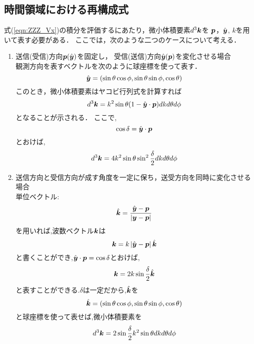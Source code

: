 \subsection{時間領域における再構成式}
式(\ref{eqn:ZZZ_Vx})の積分を評価するにあたり，微小体積要素$d^3\mbox{\boldmath $k$}$を 
$\mbox{\boldmath $p$}$，$\hat{\mbox{\boldmath $y$}}$, $k$を用いて表す必要がある．
ここでは，次のような二つのケースについて考える．
\begin{enumerate}
\item
	送信(受信)方向$\mbox{\boldmath $p$}(\hat{\mbox{\boldmath $y$}})$を固定し，
	受信(送信)方向$\hat{\mbox{\boldmath $y$}}(\mbox{\boldmath $p$})$を変化させる場合\\

	観測方向を表すベクトルを次のように球座標を使って表す．
	\begin{equation}
		\hat{\mbox{\boldmath $y$}}=(\sin\theta\cos\phi,\sin\theta\sin\phi, \cos\theta)
		\label{eqn:ZZZ_22}
	\end{equation}
	このとき，微小体積要素はヤコビ行列式を計算すれば
	\begin{equation}
		d^3\mbox{\boldmath $k$}=k^2\sin\theta (1-\hat{\mbox{\boldmath $y$}}\cdot\mbox{\boldmath $p$})dkd\theta d\phi
		\label{eqn:ZZZ_23}
	\end{equation}
	となることが示される．
	ここで,
	\begin{equation}
		\cos\delta=\hat{\mbox{\boldmath $y$}}\cdot\mbox{\boldmath $p$}
		\label{eqn:ZZZ_24}
	\end{equation}
	とおけば,
	\begin{equation}
		d^3\mbox{\boldmath $k$}=4k^2\sin\theta \sin^2 \frac{\delta}{2} dkd\theta d\phi
		\label{eqn:ZZZ_25}
	\end{equation}
\item
	送信方向と受信方向が成す角度を一定に保ち，送受方向を同時に変化させる場合\\

	単位ベクトル:
	\begin{equation}
		\hat{\mbox{\boldmath $k$}}=\frac{\hat{\mbox{\boldmath $y$}}-\mbox{\boldmath $p$}}
		{\left| \mbox{\boldmath $y$}-\mbox{\boldmath $p$} \right| }
		\label{eqn:ZZZ_26}
	\end{equation}
	を用いれば,波数ベクトル$\mbox{\boldmath $k$}$は
	\begin{equation}
		\mbox{\boldmath $k$}= k\left| \hat{\mbox{\boldmath $y$}}-\mbox{\boldmath $p$} \right| \hat{\mbox{\boldmath $k$}} 
		\label{eqn:ZZZ_27}
	\end{equation}
	と書くことができ,$\hat{\mbox{\boldmath $y$}} \cdot \mbox{\boldmath $p$}= \cos \delta$とおけば,	
	\begin{equation}
		\mbox{\boldmath $k$}= 2k \sin \frac{\delta}{2}\hat{\mbox{\boldmath $k$}} 
	\label{eqn:ZZZ_28}
	\end{equation}
	と表すことができる.$\delta$は一定だから,$\hat{\mbox{\boldmath $k$}}$を
	\begin{equation}
		\hat{\mbox{\boldmath $k$}}=(\sin\theta\cos\phi,\sin\theta\sin\phi, \cos\theta)
		\label{eqn:ZZZ_29}
	\end{equation}
	と球座標を使って表せば,微小体積要素を
	\begin{equation}
		d^3\mbox{\boldmath $k$}=2\sin\frac{\delta}{2} 
		k^2 \sin\theta dkd\theta d\phi
		\label{eqn:ZZZ_30}
	\end{equation}
\end{enumerate}
